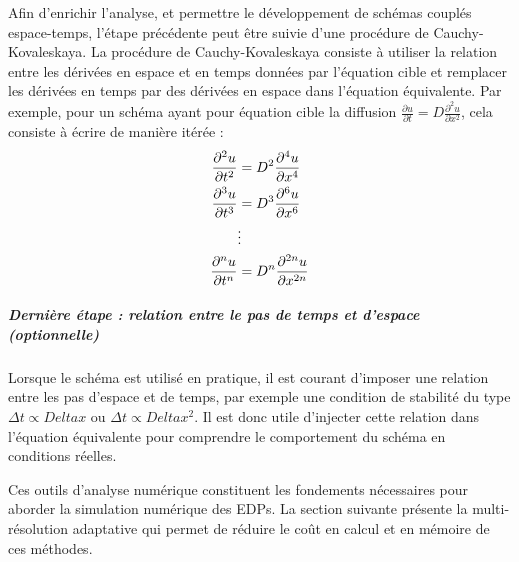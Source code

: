        Afin d'enrichir l'analyse, et permettre le développement de schémas couplés espace-temps, l'étape précédente peut être suivie d'une procédure de Cauchy-Kovaleskaya.
        La procédure de Cauchy-Kovaleskaya consiste à utiliser la relation entre les dérivées en espace et en temps données par l'équation cible et remplacer les dérivées en temps par des dérivées en espace dans l'équation équivalente.
        Par exemple, pour un schéma ayant pour équation cible la diffusion $\frac{\partial u}{\partial t} = D \frac{\partial^2 u}{\partial x^2}$, cela consiste à écrire de manière itérée :
        \begin{align}
        \frac{\partial^2 u}{\partial t^2} &= D^2 \frac{\partial^4 u}{\partial x^4} \notag \\
        \frac{\partial^3 u}{\partial t^3} &= D^3 \frac{\partial^6 u}{\partial x^6} \notag \\
        &\vdots \notag \\
        \frac{\partial^n u}{\partial t^n} &= D^n \frac{\partial^{2n} u}{\partial x^{2n}}
        \end{align}

        \subparagraph{Dernière étape : relation entre le pas de temps et d'espace (optionnelle)}

        Lorsque le schéma est utilisé en pratique, il est courant d'imposer une relation entre les pas d'espace et de temps, par exemple une condition de stabilité du type
        $\Delta t \propto Delta x$ ou $\Delta t \propto Delta x^2$.
        Il est donc utile d'injecter cette relation dans l'équation équivalente pour comprendre le comportement du schéma en conditions réelles.

        Ces outils d'analyse numérique constituent les fondements nécessaires pour aborder la simulation numérique des EDPs. La section suivante présente la multi-résolution adaptative qui permet de réduire le coût en calcul et en mémoire de ces méthodes.